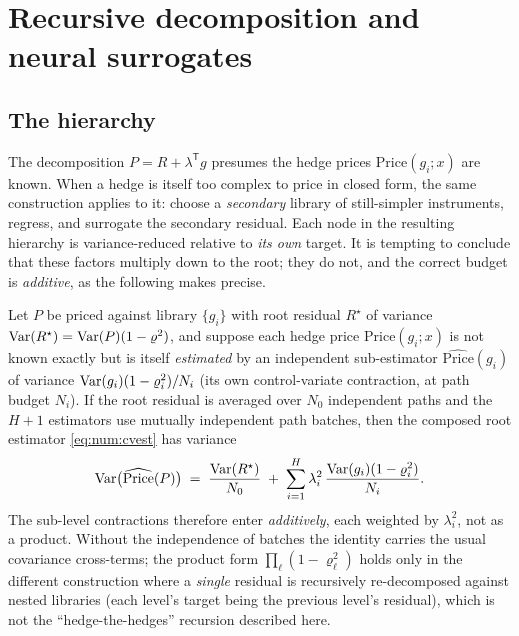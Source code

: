 \section{Recursive decomposition and neural surrogates}
\label{sec:num:recursive}

\subsection{The hierarchy}

The decomposition $P = R + \lambda^{\mathsf T} g$ presumes the hedge prices
$\mathrm{Price}(g_i;x)$ are known. When a hedge is itself too complex to price in closed
form, the same construction applies to it: choose a \emph{secondary} library of
still-simpler instruments, regress, and surrogate the secondary residual. Each
node in the resulting hierarchy is variance-reduced relative to \emph{its own}
target. It is tempting to conclude that these factors multiply down to the root;
they do not, and the correct budget is \emph{additive}, as the following makes
precise.

\begin{proposition}\label{prop:num:hierarchy}
Let $P$ be priced against library $\{g_i\}$ with root residual $R^\star$ of
variance $\operatorname{Var}(R^\star) = \operatorname{Var}(P)(1-\varrho^2)$, and suppose each hedge price
$\mathrm{Price}(g_i;x)$ is not known exactly but is itself \emph{estimated} by an
independent sub-estimator $\widehat{\mathrm{Price}}(g_i)$ of variance
$\operatorname{Var}(g_i)(1-\varrho_i^2)/N_i$ (its own control-variate contraction, at path
budget $N_i$). If the root residual is averaged over $N_0$ independent paths and
the $H+1$ estimators use mutually independent path batches, then the composed
root estimator \eqref{eq:num:cvest} has variance
\begin{equation}\label{eq:num:hierarchyvar}
   \operatorname{Var}\bigl(\widehat{\mathrm{Price}}(P)\bigr)
   \;=\;
   \frac{\operatorname{Var}(R^\star)}{N_0}
   \;+\;
   \sum_{i=1}^{H} \lambda_i^2\,\frac{\operatorname{Var}(g_i)(1-\varrho_i^2)}{N_i}.
\end{equation}
The sub-level contractions therefore enter \emph{additively}, each weighted by
$\lambda_i^2$, not as a product. Without the independence of batches the identity
carries the usual covariance cross-terms; the product form
$\prod_\ell(1-\varrho_\ell^2)$ holds only in the different construction where a
\emph{single} residual is recursively re-decomposed against nested libraries
(each level's target being the previous level's residual), which is not the
``hedge-the-hedges'' recursion described here.
\end{proposition}

